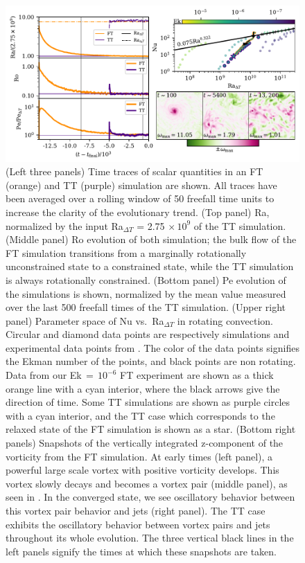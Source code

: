 \begin{figure}
\includegraphics[width=\textwidth]{./figs/rotating_panels.pdf}
\caption[Time traces, parameter space plot, and snapshots showing evolution of rotating FT simulation]{ 
	(Left three panels) Time traces of scalar quantities in an FT (orange) and TT (purple) simulation are shown.
	All traces have been averaged over a rolling window of 50 freefall time units to increase the clarity of the evolutionary trend.
	(Top panel) Ra, normalized by the input Ra$_{\Delta T}$ = 2.75$\,\times 10^9$ of the TT simulation.
	(Middle panel) Ro evolution of both simulation; the bulk flow of the FT simulation transitions from a marginally rotationally unconstrained state to a constrained state, while the TT simulation is always rotationally constrained.
	(Bottom panel) Pe evolution of the simulations is shown, normalized by the mean value measured over the last 500 freefall times of the TT simulation.
	(Upper right panel) Parameter space of Nu vs.~Ra$_{\Delta T}$ in rotating convection.
	Circular and diamond data points are respectively simulations and experimental data points from \citet{cheng&all2015}.
	The color of the data points signifies the Ekman number of the points, and black points are non rotating.
	Data from our Ek$\,=\,10^{-6}$ FT experiment are shown as a thick orange line with a cyan interior, where the black arrows give the direction of time.
	Some TT simulations are shown as purple circles with a cyan interior, and the TT case which corresponds to the relaxed state of the FT simulation is shown as a star.
	(Bottom right panels) Snapshots of the vertically integrated z-component of the vorticity from the FT simulation.
	At early times (left panel), a powerful large scale vortex with positive vorticity develops.
	This vortex slowly decays and becomes a vortex pair (middle panel), as seen in \citet{stellmach&all2014}.
	In the converged state, we see oscillatory behavior between this vortex pair behavior and jets (right panel).
	The TT case exhibits the oscillatory behavior between vortex pairs and jets throughout its whole evolution.
	The three vertical black lines in the left panels signify the times at which these snapshots are taken.
\label{fig:rotating_panels} }
\end{figure}



